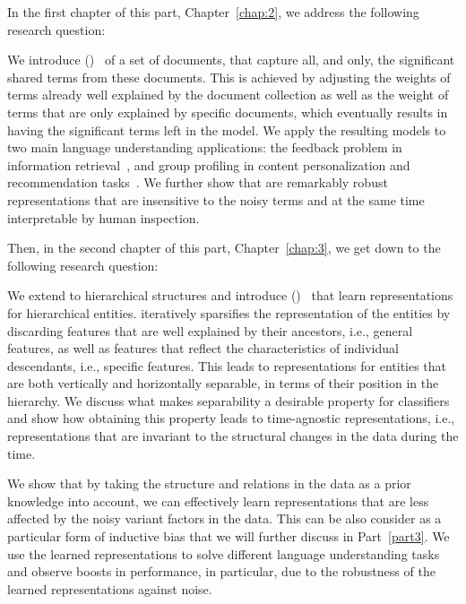 In the first chapter of this part, Chapter~\ref{chap:2}, we address the following research question:

We introduce \emph{\swlms} (\acswlm)~\citep{Dehghani:2016:SIGIR} of a set of documents, that capture all, and only, the significant shared terms from these documents.  This is achieved by adjusting the weights of terms already well explained by the document collection as well as the weight of terms that are only explained by specific documents, which eventually results in having the significant terms left in the model. 
We apply the resulting models to two main language understanding applications: the feedback problem in information retrieval~\citep{Dehghani:CIKM2016:long, Dehghani:CIKM2016:short}, and group profiling in content personalization and recommendation tasks~\citep{Dehghani:2016:CHIIR,Dehghani2016:trec}. We further show that \acswlm are remarkably robust representations that are insensitive to the noisy terms and at the same time interpretable by human inspection. 

Then, in the second chapter of this part, Chapter~\ref{chap:3}, we get down to the following research question:

We extend \emph{\swlms} to hierarchical structures and introduce \emph{\hswlms} (\achswlm)~\citep{Dehghani:2016:ICTIR, Dehghani:2016:CLEF} that learn representations for hierarchical entities. \achswlm iteratively sparsifies the representation of the entities by discarding features that are well explained by their ancestors, i.e., general features, as well as features that reflect the characteristics of individual descendants, i.e., specific features. This leads to representations for entities that are both vertically and horizontally separable, in terms of their position in the hierarchy. We discuss what makes separability a desirable property for classifiers and show how obtaining this property leads to time-agnostic representations, i.e., representations that are invariant to the structural changes in the data during the time.

\medskip
We show that by taking the structure and relations in the data as a prior knowledge into account, we can effectively learn representations that are less affected by the noisy variant factors in the data. This can be also consider as a particular form of inductive bias that we will further discuss in Part~\ref{part3}. 
We use the learned representations to solve different language understanding tasks and observe boosts in performance, in particular, due to the robustness of the learned representations against noise.

% 
